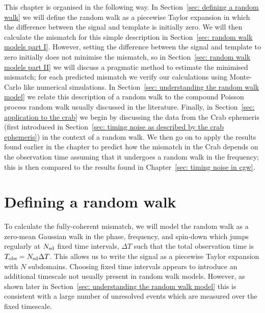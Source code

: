 \documentclass[../full_thesis/full_thesis.tex]{subfiles}
\begin{document}
This chapter is organised in the following way. In Section~\ref{sec: defining a
random walk} we will define the random walk as a piecewise Taylor expansion in
which the difference between the signal and template is initially zero. We will
then calculate the mismatch for this simple description in Section~\ref{sec:
random walk models part I}. However, setting the difference between the signal
and template to zero initially does not minimise the mismatch, so in
Section~\ref{sec: random walk models part II} we will discuss a pragmatic
method to estimate the minimised mismatch; for each predicted mismatch we
verify our calculations using Monte-Carlo like numerical simulations. In
Section~\ref{sec: understanding the random walk model} we relate this
description of a random walk to the compound Poisson process random walk
usually discussed in the literature.  Finally, in Section~\ref{sec: application
to the crab} we begin by discussing the data from the Crab ephemeris (first
introduced in Section~\ref{sec: timing noise as described by the crab
ephemeris}) in the context of a random walk.  We then go on to apply the
results found earlier in the chapter to predict how the mismatch in the Crab
depends on the observation time assuming that it undergoes a random walk in the
frequency; this is then compared to the results found in Chapter~\ref{sec:
timing noise in cgw}.

\section{Defining a random walk}
\label{sec: defining a random walk}
To calculate the fully-coherent mismatch, we will model the random walk as a
zero-mean Gaussian walk in the phase, frequency, and spin-down which jumps
regularly at $N_{\textrm{sd}}$ fixed time intervals, $\Delta T$ such that the total
observation time is $T_{\mathrm{obs}} = N_{\textrm{sd}} \Delta T$.  This allows us to write the
signal as a piecewise Taylor expansion with $N$ subdomains. Choosing fixed time
intervals appears to introduce an additional timescale not usually present in
random walk models.  However, as shown later in Section~\ref{sec: understanding
the random walk model} this is consistent with a large number of unresolved
events which are measured over the fixed timescale.
\end{document}

